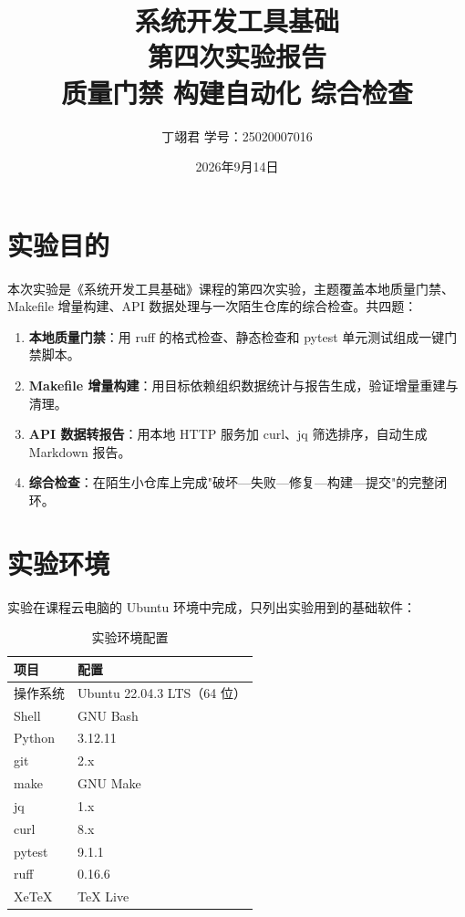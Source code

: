 \documentclass[12pt,a4paper]{article}
\title{\vspace{3cm}\Huge\textbf{系统开发工具基础}\\[0.5cm]
\LARGE 第四次实验报告\\[1cm]
\Large 质量门禁 \quad 构建自动化 \quad 综合检查}
\author{丁翊君 \quad 学号：25020007016}
\date{2026年9月14日}
\begin{document}
\maketitle
\thispagestyle{empty}
\newpage

\tableofcontents
\newpage

\section{实验目的}

本次实验是《系统开发工具基础》课程的第四次实验，主题覆盖本地质量门禁、Makefile 增量构建、API 数据处理与一次陌生仓库的综合检查。共四题：

\begin{enumerate}
    \item \textbf{本地质量门禁}：用 ruff 的格式检查、静态检查和 pytest 单元测试组成一键门禁脚本。
    \item \textbf{Makefile 增量构建}：用目标依赖组织数据统计与报告生成，验证增量重建与清理。
    \item \textbf{API 数据转报告}：用本地 HTTP 服务加 curl、jq 筛选排序，自动生成 Markdown 报告。
    \item \textbf{综合检查}：在陌生小仓库上完成"破坏—失败—修复—构建—提交"的完整闭环。
\end{enumerate}

\section{实验环境}

实验在课程云电脑的 Ubuntu 环境中完成，只列出实验用到的基础软件：

\begin{table}[H]
\centering
\caption{实验环境配置}
\begin{tabular}{|l|l|}
\hline
\textbf{项目} & \textbf{配置} \\
\hline
操作系统 & Ubuntu 22.04.3 LTS（64 位） \\
\hline
Shell & GNU Bash \\
\hline
Python & 3.12.11 \\
\hline
git & 2.x \\
\hline
make & GNU Make \\
\hline
jq & 1.x \\
\hline
curl & 8.x \\
\hline
pytest & 9.1.1 \\
\hline
ruff & 0.16.6 \\
\hline
XeTeX & TeX Live \\
\hline
\end{tabular}
\end{table}
\end{document}
